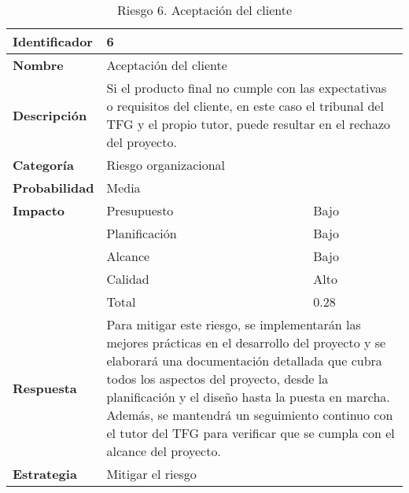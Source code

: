 \begin{table}[H]
    \centering
    \caption{Riesgo 6. Aceptación del cliente }
    \label{table:risk_aceptacion}
    \begin{tabular}{>{\columncolor{lightgreen!20}}l l l}
    \toprule
    \rowcolor{lightgreen}
    \textbf{Identificador} & \multicolumn{2}{l}{6} \\
    \midrule
    \textbf{Nombre} & \multicolumn{2}{l}{Aceptación del cliente} \\
    \midrule
    \textbf{Descripción} & \multicolumn{2}{p{10cm}}{Si el producto final no cumple con las expectativas o requisitos del cliente, en este caso el tribunal del TFG y el propio tutor, puede resultar en el rechazo del proyecto.} \\
    \midrule
    \textbf{Categoría} & \multicolumn{2}{l}{Riesgo organizacional} \\
    \midrule
    \textbf{Probabilidad} & \multicolumn{2}{l}{Media} \\
    \midrule
    \textbf{Impacto} & Presupuesto & Bajo \\
    \cmidrule(lr){2-3}
    & Planificación & Bajo \\
    \cmidrule(lr){2-3}
    & Alcance & Bajo \\
    \cmidrule(lr){2-3}
    & Calidad & Alto \\
    \cmidrule(lr){2-3}
    & Total & 0.28 \\
    \midrule
    \textbf{Respuesta} & \multicolumn{2}{p{10cm}}{Para mitigar este riesgo, se implementarán las mejores prácticas en el desarrollo del proyecto y se elaborará una documentación detallada que cubra todos los aspectos del proyecto, desde la planificación y el diseño hasta la puesta en marcha. Además, se mantendrá un seguimiento continuo con el tutor del TFG para verificar que se cumpla con el alcance del proyecto.} \\
    \midrule
    \textbf{Estrategia} & \multicolumn{2}{l}{Mitigar el riesgo} \\
    \bottomrule
    \end{tabular}
\end{table}



